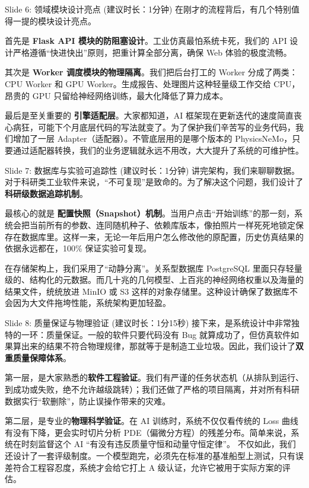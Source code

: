 \documentclass[UTF8,11pt]{ctexart}
\begin{document}
\begin{slidebox}{Slide 6: 领域模块设计亮点 (建议时长：1分钟)}
在刚才的流程背后，有几个特别值得一提的模块设计亮点。

首先是 \textbf{Flask API 模块的防阻塞设计}。工业仿真最怕系统卡死，我们的 API 设计严格遵循“快进快出”原则，把重计算全部分离，确保 Web 体验的极度流畅。

其次是 \textbf{Worker 调度模块的物理隔离}。我们把后台打工的 Worker 分成了两类：CPU Worker 和 GPU Worker。生成报告、处理图片这种轻量级工作交给 CPU，昂贵的 GPU 只留给神经网络训练，最大化降低了算力成本。

最后是至关重要的 \textbf{引擎适配层}。大家都知道，AI 框架现在更新迭代的速度简直丧心病狂，可能下个月底层代码的写法就变了。为了保护我们辛苦写的业务代码，我们增加了一层 Adapter（适配器）。不管底层用的是哪个版本的 PhysicsNeMo，只要通过适配器转换，我们的业务逻辑就永远不用改，大大提升了系统的可维护性。
\end{slidebox}

\begin{slidebox}{Slide 7: 数据库与实验可追踪性 (建议时长：1分钟)}
讲完架构，我们来聊聊数据。对于科研类工业软件来说，“不可复现”是致命的。为了解决这个问题，我们设计了\textbf{科研级数据追踪机制}。

最核心的就是 \textbf{配置快照（Snapshot）机制}。当用户点击“开始训练”的那一刻，系统会把当前所有的参数、连同随机种子、依赖库版本，像拍照片一样死死地锁定保存在数据库里。这样一来，无论一年后用户怎么修改他的原配置，历史仿真结果的依据永远都在，100\% 保证实验可复现。

在存储架构上，我们采用了“动静分离”。关系型数据库 PostgreSQL 里面只存轻量级的、结构化的元数据。而几十兆的几何模型、上百兆的神经网络权重以及海量的结果文件，统统放进 MinIO 或 S3 这样的对象存储里。这种设计确保了数据库不会因为大文件拖垮性能，系统架构更加轻盈。
\end{slidebox}

\begin{slidebox}{Slide 8: 质量保证与物理验证 (建议时长：1分15秒)}
接下来，是系统设计中非常独特的一环：质量保证。一般的软件只要代码没有 Bug 就算成功了，但仿真软件如果算出来的结果不符合物理规律，那就等于是制造工业垃圾。因此，我们设计了\textbf{双重质量保障体系}。

第一层，是大家熟悉的\textbf{软件工程验证}。我们有严谨的任务状态机（从排队到运行、到成功或失败，绝不允许越级跳转）；我们还做了严格的项目隔离，并对所有科研数据实行“软删除”，防止误操作带来的灾难。

第二层，是专业的\textbf{物理科学验证}。在 AI 训练时，系统不仅仅看传统的 Loss 曲线有没有下降，更会实时切片分析 PDE（偏微分方程）的残差分布。简单来说，系统在时刻监督这个 AI “有没有违反质量守恒和动量守恒定律”。
不仅如此，我们还设计了一套评级制度。一个模型跑完，必须先在标准的基准船型上测试，只有误差符合工程容忍度，系统才会给它打上 A 级认证，允许它被用于实际方案的评估。
\end{slidebox}
\end{document}
